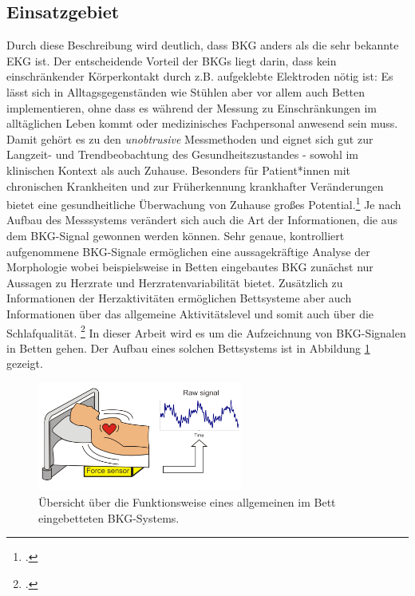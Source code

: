 	\subsection{Einsatzgebiet}
	
	Durch diese Beschreibung wird deutlich, dass \ac{BKG} anders als die sehr bekannte \ac{EKG} ist. Der entscheidende Vorteil der \ac{BKG}s liegt darin, dass kein einschränkender Körperkontakt durch z.B. aufgeklebte Elektroden nötig ist: Es lässt sich in Alltagsgegenständen wie Stühlen aber vor allem auch Betten implementieren, ohne dass es während der Messung zu Einschränkungen im alltäglichen Leben kommt oder medizinisches Fachpersonal anwesend sein muss. Damit gehört es zu den \textit{unobtrusive} Messmethoden und eignet sich gut zur Langzeit- und Trendbeobachtung des Gesundheitszustandes - sowohl im klinischen Kontext als auch Zuhause. Besonders für Patient*innen mit chronischen Krankheiten und zur Früherkennung krankhafter Veränderungen bietet eine gesundheitliche Überwachung von Zuhause großes Potential.\footcite[Vgl.][]{Inan2015} Je nach Aufbau des Messsystems verändert sich auch die Art der Informationen, die aus dem \ac{BKG}-Signal gewonnen werden können. Sehr genaue, kontrolliert aufgenommene \ac{BKG}-Signale ermöglichen eine aussagekräftige Analyse der Morphologie wobei beispielsweise in Betten eingebautes \ac{BKG} zunächst nur Aussagen zu Herzrate und Herzratenvariabilität bietet. Zusätzlich zu Informationen der Herzaktivitäten ermöglichen Bettsysteme aber auch Informationen über das allgemeine Aktivitätslevel und somit auch über die Schlafqualität. \footcite[Vgl.][]{Bruser2011} In dieser Arbeit wird es um die Aufzeichnung von \ac{BKG}-Signalen in Betten gehen. Der Aufbau eines solchen Bettsystems ist in Abbildung \ref{fig:bcgbed} gezeigt.
	
	 \begin{figure}[H]
	 	\centering
		\includegraphics[width=0.6\textwidth]{pic/bcgBed.png}
		\caption[Übersicht über die Funktionsweise eines allgemeinen im Bett eingebetteten \ac{BKG}-Systems]{Übersicht über die Funktionsweise eines allgemeinen im Bett eingebetteten \ac{BKG}-Systems.\protect\footnotemark}
		\label{fig:bcgbed}
	\end{figure}
	

